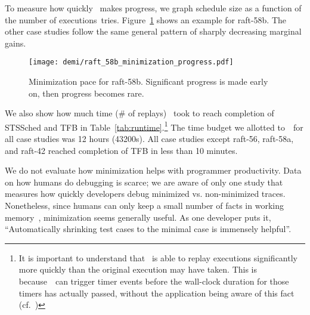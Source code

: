 
 To measure how quickly \sys~makes
progress, we graph schedule size as a function of the number of
executions~\sys tries.
Figure~\ref{fig:progress} shows an example for
raft-58b. The other case studies follow the same general pattern of sharply decreasing
marginal gains.

\begin{figure}[tb]
    \texttt{[image: demi/raft\_58b\_minimization\_progress.pdf]}
    \caption[]{\label{fig:progress} Minimization pace for raft-58b. Significant progress is made early on, then progress becomes rare.}
\end{figure}


We also show how much time (\# of replays) \sys~took to reach completion of
STSSched and TFB in Table~\ref{tab:runtime}.\footnote{It is important
to understand that \sys~is able to replay executions significantly more quickly
than the original execution may have taken. This is because~\sys~can trigger timer events before the wall-clock duration for
those timers has actually passed, without the application being aware of this
fact (cf.~\cite{Gupta06toinfinity})} The time budget we allotted to~\sys~for all case studies was 12 hours (43200s).
All case studies except raft-56, raft-58a, and raft-42 reached completion of TFB in less than 10
minutes.

 We do not evaluate how minimization helps
with programmer productivity. Data on how humans do debugging is scarce; we
are aware of only one study that measures how
quickly developers debug minimized vs. non-minimized traces\cite{fse_web_ddmin}.
Nonetheless, since humans can only keep a small number of facts in working
memory~\cite{miller56seven}, minimization seems generally useful. As one
developer
puts it,
``Automatically shrinking test cases to the
minimal case is immensely helpful''\cite{riak_quote}.

